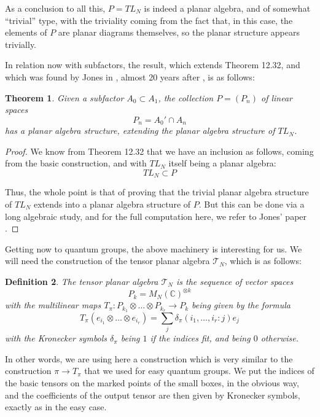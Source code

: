 \documentclass[12pt]{amsbook}
\newtheorem{theorem}{Theorem}[chapter]
\newtheorem{definition}[theorem]{Definition}
\begin{document}
As a conclusion to all this, $P=TL_N$ is indeed a planar algebra, and of somewhat ``trivial'' type, with the triviality coming from the fact that, in this case, the elements of $P$ are planar diagrams themselves, so the planar structure appears trivially.

\bigskip

In relation now with subfactors, the result, which extends Theorem 12.32, and which was found by Jones in \cite{jo3}, almost 20 years after \cite{jo1}, is as follows:


\begin{theorem} 
Given a subfactor $A_0\subset A_1$, the collection $P=(P_n)$ of linear spaces 
$$P_n=A_0'\cap A_n$$
has a planar algebra structure, extending the planar algebra structure of $TL_N$.
\end{theorem}

\begin{proof}
We know from Theorem 12.32 that we have an inclusion as follows, coming from the basic construction, and with $TL_N$ itself being a planar algebra:
$$TL_N\subset P$$

Thus, the whole point is that of proving that the trivial planar algebra structure of $TL_N$ extends into a planar algebra structure of $P$. But this can be done via a long algebraic study, and for the full computation here, we refer to Jones' paper \cite{jo3}.
\end{proof}

Getting now to quantum groups, the above machinery is interesting for us. We will need the construction of the tensor planar algebra $\mathcal T_N$, which is as follows:


\begin{definition}
The tensor planar algebra $\mathcal T_N$ is the sequence of vector spaces 
$$P_k=M_N(\mathbb C)^{\otimes k}$$
with the multilinear maps $T_\pi:P_{k_1}\otimes\ldots\otimes P_{k_r}\to P_k$
being given by the formula
$$T_\pi(e_{i_1}\otimes\ldots\otimes e_{i_r})=\sum_j\delta_\pi(i_1,\ldots,i_r:j)e_j$$
with the Kronecker symbols $\delta_\pi$ being $1$ if the indices fit, and being $0$ otherwise.
\end{definition}

In other words, we are using here a construction which is very similar to the construction $\pi\to T_\pi$ that we used for easy quantum groups. We put the indices of the basic tensors on the marked points of the small boxes, in the obvious way, and the coefficients of the output tensor are then given by Kronecker symbols, exactly as in the easy case.
\end{document}
